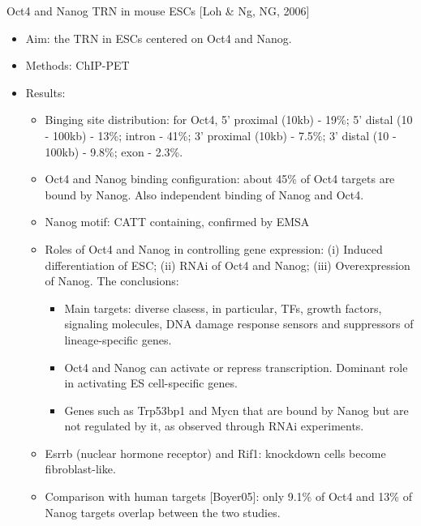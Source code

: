 \documentclass{report}
\begin{document}
Oct4 and Nanog TRN in mouse ESCs [Loh \& Ng, NG, 2006]
\begin{itemize}
	\item Aim: the TRN in ESCs centered on Oct4 and Nanog. 
	
	\item Methods: ChIP-PET
	
	\item Results: 
	\begin{itemize}
		\item Binging site distribution: for Oct4, 5' proximal (10kb) - 19\%; 5' distal (10 - 100kb) - 13\%; intron - 41\%; 3' proximal (10kb) - 7.5\%; 3' distal (10 - 100kb) - 9.8\%; exon - 2.3\%. 
		\item Oct4 and Nanog binding configuration: about 45\% of Oct4 targets are bound by Nanog. Also independent binding of Nanog and Oct4. 
		\item Nanog motif: CATT containing, confirmed by EMSA
		\item Roles of Oct4 and Nanog in controlling gene expression: (i) Induced differentiation of ESC; (ii) RNAi of Oct4 and Nanog; (iii) Overexpression of Nanog. The conclusions: 
		\begin{itemize}
			\item Main targets: diverse clasess, in particular, TFs, growth factors, signaling molecules, DNA damage response sensors and suppressors of lineage-specific genes. 
			\item Oct4 and Nanog can activate or repress transcription. Dominant role in activating ES cell-specific genes. 
			\item Genes such as Trp53bp1 and Mycn that are bound by Nanog but are not regulated by it, as observed through RNAi experiments. 
		\end{itemize}
		\item Esrrb (nuclear hormone receptor) and Rif1: knockdown cells become fibroblast-like. 
		\item Comparison with human targets [Boyer05]: only 9.1\% of Oct4 and 13\% of Nanog targets overlap between the two studies. 
	\end{itemize}
\end{itemize}
	
\end{document}
